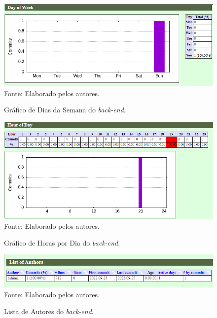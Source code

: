 \documentclass[
    12pt,               %
    openright,          %
    oneside,
    a4paper,            %
    BIBLATEX,           %
    TODO,               %
    english,            %
    brazil              %
    ]{ifsp-spo-inf-ctds}
\begin{document}
            \begin{figure}[H]
                \centering
                \caption{Gráfico de Dias da Semana do \emph{back-end}.}
                \includegraphics[width=1 \textwidth]{Gitstats/back-end/DiasBack.png}
                {\footnotesize Fonte: Elaborado pelos autores.}
                \label{fig:diasBack}
            \end{figure}

            \begin{figure}[H]
                \centering
                \caption{Gráfico de Horas por Dia do \emph{back-end}.}
                \includegraphics[width=1 \textwidth]{Gitstats/back-end/HorasBack.png}
                {\footnotesize Fonte: Elaborado pelos autores.}
                \label{fig:HorasBack}
            \end{figure} 

            \begin{figure}[H]
                \centering
                \caption{Lista de Autores do \emph{back-end}.}
                \includegraphics[width=1 \textwidth]{Gitstats/back-end/AutorBack.png}
                {\footnotesize Fonte: Elaborado pelos autores.}
                \label{fig:AutorBack}
            \end{figure}
            
\end{document}
